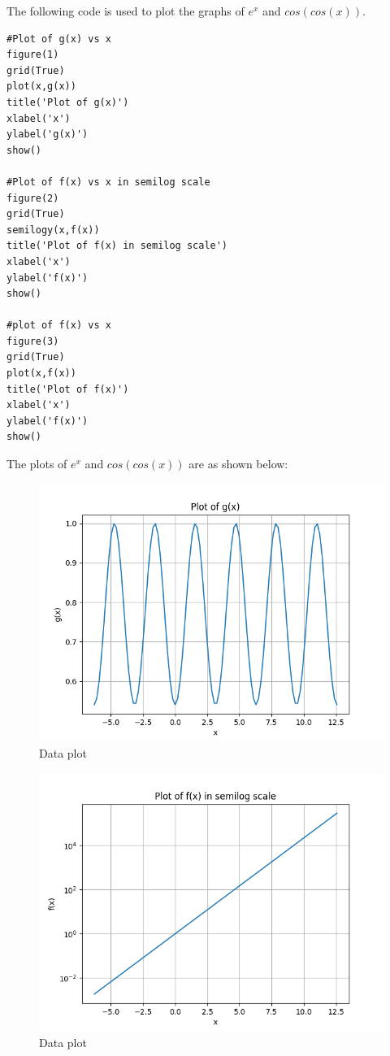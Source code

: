 \documentclass[11pt, a4paper]{article}
\begin{document}
The following code is used to plot the graphs of $e^{x}$ and $cos(cos(x))$.
\begin{verbatim}
#Plot of g(x) vs x 
figure(1)
grid(True)
plot(x,g(x))
title('Plot of g(x)')
xlabel('x')
ylabel('g(x)')
show()

#Plot of f(x) vs x in semilog scale
figure(2)
grid(True)
semilogy(x,f(x))
title('Plot of f(x) in semilog scale')
xlabel('x')
ylabel('f(x)')
show()

#plot of f(x) vs x
figure(3)
grid(True)
plot(x,f(x))
title('Plot of f(x)')
xlabel('x')
ylabel('f(x)')
show()
\end{verbatim}
The plots of $e^{x}$ and $cos(cos(x))$ are as shown below:
   \begin{figure}[!tbh]
   	\centering
   	\includegraphics[scale=0.6]{Figure1.png}   
   	\caption{Data plot}
   	\label{fig:sample}
   \end{figure} 
   
   \begin{figure}[!tbh]
   	\centering
   	\includegraphics[scale=0.6]{Figure2.png}   
   	\caption{Data plot}
   	\label{fig:sample}
   \end{figure} 
\end{document}
